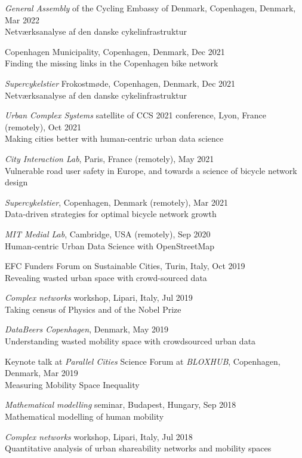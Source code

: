 \documentclass[10pt,a4paper]{article}
\renewenvironment{itemize}{
  \begin{list}{}{
    \setlength{\leftmargin}{1.5em}
    \setlength{\itemsep}{0.25em}
    \setlength{\parskip}{0pt}
    \setlength{\parsep}{0.25em}
  }
}{
  \end{list}
}
\begin{document}
\begin{itemize}
\item{\emph{General Assembly} of the Cycling Embassy of Denmark, Copenhagen, Denmark, Mar 2022\\Netværksanalyse af den danske cykelinfrastruktur}
\item{Copenhagen Municipality, Copenhagen, Denmark, Dec 2021\\Finding the missing links in the Copenhagen bike network}
\item{\emph{Supercykelstier} Frokostmøde, Copenhagen, Denmark, Dec 2021\\Netværksanalyse af den danske cykelinfrastruktur}
\item{\emph{Urban Complex Systems} satellite of CCS 2021 conference, Lyon, France (remotely), Oct 2021\\Making cities better with human-centric urban data science}
\item{\emph{City Interaction Lab}, Paris, France (remotely), May 2021\\Vulnerable road user safety in Europe, and towards a science of bicycle network design}
\item{\emph{Supercykelstier}, Copenhagen, Denmark (remotely), Mar 2021\\Data-driven strategies for optimal bicycle network growth}
\item{\emph{MIT Medial Lab}, Cambridge, USA (remotely), Sep 2020\\Human-centric Urban Data Science with OpenStreetMap}
\item{EFC Funders Forum on Sustainable Cities, Turin, Italy, Oct 2019\\Revealing wasted urban space with crowd-sourced data}
\item{\emph{Complex networks} workshop, Lipari, Italy, Jul 2019\\Taking census of Physics and of the Nobel Prize}
\item{\emph{DataBeers Copenhagen}, Denmark, May 2019\\Understanding wasted mobility space with crowdsourced urban data}
\item{Keynote talk at \emph{Parallel Cities} Science Forum at \emph{BLOXHUB}, Copenhagen, Denmark, Mar 2019\\Measuring Mobility Space Inequality}
\item{\emph{Mathematical modelling} seminar, Budapest, Hungary, Sep 2018\\Mathematical modelling of human mobility}
\item{\emph{Complex networks} workshop, Lipari, Italy, Jul 2018\\Quantitative analysis of urban shareability networks and mobility spaces}

\end{itemize}
\end{document}
